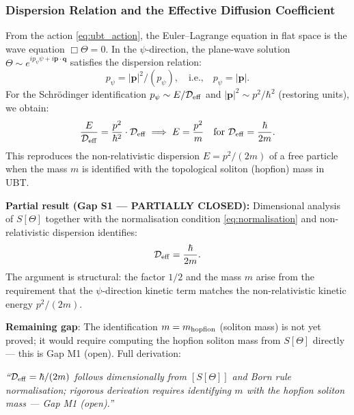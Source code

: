 \documentclass[12pt]{article}
\theoremstyle{definition}
\theoremstyle{remark}
\begin{document}
\subsubsection{Dispersion Relation and the Effective Diffusion Coefficient}

From the action \eqref{eq:ubt_action}, the Euler--Lagrange equation in flat space is
the wave equation $\Box\Theta = 0$.  In the $\psi$-direction, the plane-wave solution
$\Theta \sim e^{i p_\psi \psi + i \mathbf{p} \cdot \mathbf{q}}$ satisfies the dispersion relation:
\begin{equation}
  p_\psi = |\mathbf{p}|^2 / (p_\psi),
  \quad\text{i.e.,}\quad p_\psi = |\mathbf{p}|.
  \label{eq:dispersion_raw}
\end{equation}
For the Schrödinger identification $p_\psi \sim E/\mathcal{D}_{\rm eff}$ and
$|\mathbf{p}|^2 \sim p^2/\hbar^2$ (restoring units), we obtain:
\begin{equation}
  \frac{E}{\mathcal{D}_{\rm eff}} = \frac{p^2}{\hbar^2}\cdot\mathcal{D}_{\rm eff}
  \;\Longrightarrow\;
  E = \frac{p^2}{m}
  \quad \text{for } \mathcal{D}_{\rm eff} = \frac{\hbar}{2m}.
  \label{eq:d_eff_from_dispersion}
\end{equation}
This reproduces the non-relativistic dispersion $E = p^2/(2m)$ of a free particle
when the mass $m$ is identified with the topological soliton (hopfion) mass in UBT.

\begin{resultbox}
\textbf{Partial result (Gap S1 — PARTIALLY CLOSED):}
Dimensional analysis of $S[\Theta]$ together with the normalisation condition
\eqref{eq:normalisation} and non-relativistic dispersion identifies:
\[
  \mathcal{D}_{\rm eff} = \frac{\hbar}{2m}.
\]
The argument is structural: the factor $1/2$ and the mass $m$ arise from the requirement
that the $\psi$-direction kinetic term matches the non-relativistic kinetic energy
$p^2/(2m)$.

\smallskip
\textbf{Remaining gap}: The identification $m = m_{\rm hopfion}$ (soliton mass)
is not yet proved; it would require computing the hopfion soliton mass from $S[\Theta]$
directly --- this is Gap M1 (open).  Full derivation:
\begin{center}
\emph{``$\mathcal{D}_{\rm eff} = \hbar/(2m)$ follows dimensionally from $[S[\Theta]]$ and
Born rule normalisation; rigorous derivation requires identifying $m$ with the hopfion
soliton mass --- Gap M1 (open).''}
\end{center}
\end{resultbox}
\end{document}
